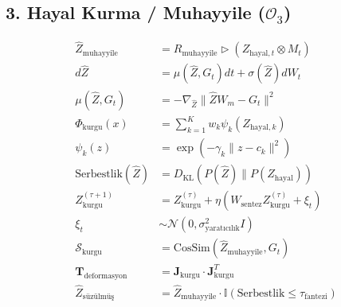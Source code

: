 \documentclass[11pt, a4paper]{article}
\begin{document}
\subsection{3. Hayal Kurma / Muhayyile ($\mathcal{O}_3$)}
\begin{align}
\hat{Z}_{\text{muhayyile}} &= R_{\text{muhayyile}} \triangleright \left( Z_{\text{hayal}, t} \otimes M_t \right) \\
d\hat{Z} &= \mu(\hat{Z}, G_t)dt + \sigma(\hat{Z}) dW_t \\
\mu(\hat{Z}, G_t) &= -\nabla_{\hat{Z}} \|\hat{Z} W_m - G_t\|^2 \\
\Phi_{\text{kurgu}}(x) &= \sum_{k=1}^K w_k \psi_k(Z_{\text{hayal}, k}) \\
\psi_k(z) &= \exp(-\gamma_k \|z - c_k\|^2) \\
\text{Serbestlik}(\hat{Z}) &= D_{\text{KL}}\left(P(\hat{Z}) \parallel P(Z_{\text{hayal}})\right) \\
Z_{\text{kurgu}}^{(\tau+1)} &= Z_{\text{kurgu}}^{(\tau)} + \eta \left( W_{\text{sentez}} Z_{\text{kurgu}}^{(\tau)} + \xi_t \right) \\
\xi_t &\sim \mathcal{N}(0, \sigma_{\text{yaratıcılık}}^2 I) \\
\mathcal{S}_{\text{kurgu}} &= \text{CosSim}(\hat{Z}_{\text{muhayyile}}, G_t) \\
\mathbf{T}_{\text{deformasyon}} &= \mathbf{J}_{\text{kurgu}} \cdot \mathbf{J}_{\text{kurgu}}^T \\
\hat{Z}_{\text{süzülmüş}} &= \hat{Z}_{\text{muhayyile}} \cdot \mathbb{I}(\text{Serbestlik} \le \tau_{\text{fantezi}})
\end{align}
\end{document}
